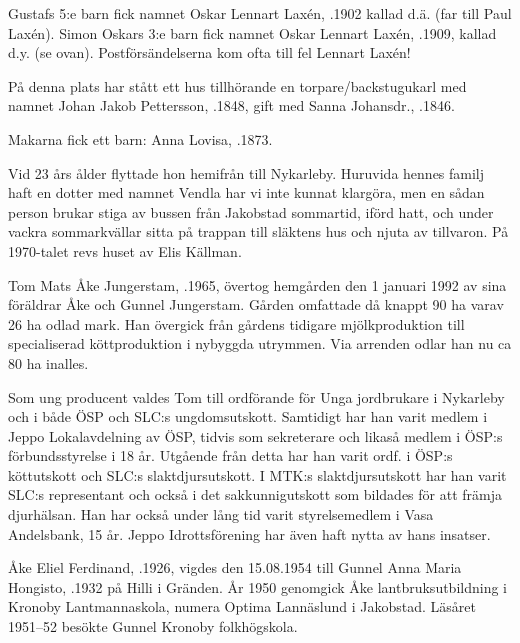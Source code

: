 Gustafs  5:e barn fick namnet Oskar Lennart Laxén, .1902 kallad  d.ä. (far till Paul Laxén). Simon Oskars 3:e barn fick namnet Oskar Lennart Laxén, .1909, kallad d.y. (se ovan). Postförsändelserna kom ofta till fel Lennart Laxén!





På denna plats har stått ett hus tillhörande en torpare/backstugukarl med namnet Johan Jakob Pettersson, .1848, gift med Sanna Johansdr., .1846.

Makarna fick ett barn: Anna Lovisa, .1873.

Vid 23 års ålder flyttade hon hemifrån till Nykarleby. Huruvida hennes familj haft en dotter med namnet Vendla har vi inte kunnat klargöra, men en sådan person brukar stiga av bussen från Jakobstad sommartid, iförd hatt, och under vackra sommarkvällar sitta på trappan till släktens hus och njuta av tillvaron. På 1970-talet revs huset av Elis Källman.






Tom Mats Åke Jungerstam, .1965, övertog hemgården den 1 januari 1992 av sina föräldrar Åke och Gunnel Jungerstam. Gården omfattade då knappt 90 ha varav 26 ha odlad mark. Han övergick från gårdens tidigare mjölkproduktion till specialiserad köttproduktion i nybyggda utrymmen. Via arrenden odlar han nu ca 80 ha inalles.

Som ung producent valdes Tom till ordförande för Unga jordbrukare i Nykarleby och i både ÖSP och SLC:s  ungdomsutskott. Samtidigt har han varit medlem i Jeppo Lokalavdelning av ÖSP, tidvis som sekreterare och likaså medlem i ÖSP:s förbundsstyrelse i 18 år. Utgående från detta har han varit ordf. i ÖSP:s köttutskott och SLC:s slaktdjursutskott. I MTK:s slaktdjursutskott har han varit SLC:s representant och också i det sakkunnigutskott som bildades för att främja djurhälsan. Han har också under lång tid varit styrelsemedlem i Vasa Andelsbank, 15 år. Jeppo Idrottsförening har även haft nytta av hans insatser.


Åke Eliel Ferdinand, .1926, vigdes den 15.08.1954 till Gunnel Anna Maria Hongisto, .1932 på Hilli i Gränden. År 1950 genomgick Åke lantbruksutbildning i Kronoby Lantmannaskola, numera Optima Lannäslund i Jakobstad. Läsåret 1951--52 besökte Gunnel Kronoby folkhögskola.

